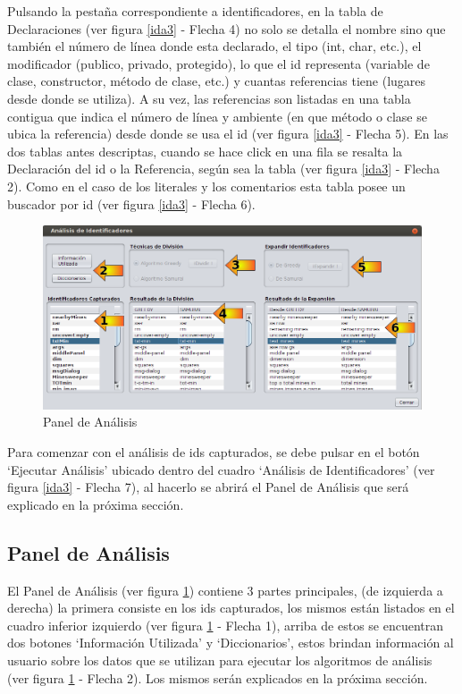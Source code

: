 \documentclass[a4paper,12pt]{report}
\begin{document}
Pulsando la pestaña correspondiente a identificadores, en la tabla de Declaraciones (ver figura \ref{ida3} - Flecha 4) no solo se detalla el nombre sino que también el número de línea donde esta declarado, el tipo (int, char, etc.), el modificador (publico, privado, protegido), lo que el id representa (variable de clase, constructor, método de clase, etc.) y cuantas referencias tiene (lugares desde donde se utiliza). A su vez, las referencias son listadas en una tabla contigua que indica el número de línea y ambiente (en que método o clase se ubica la referencia) desde donde se usa el id (ver figura \ref{ida3} - Flecha 5). En las dos tablas antes descriptas, cuando se hace click en una fila se resalta la Declaración del id o la Referencia, según sea la tabla (ver figura \ref{ida3} - Flecha 2). Como en el caso de los literales y los comentarios esta tabla posee un buscador por id (ver figura \ref{ida3} - Flecha 6). 

\begin{figure}[t] %
\centerline{%
\includegraphics[scale= 0.6]{./ida_06.png}
}
\caption{Panel de Análisis}
\label{ida6}
\end{figure}

Para comenzar con el análisis de ids capturados, se debe pulsar en el botón `Ejecutar Análisis' ubicado dentro del cuadro `Análisis de Identificadores' (ver figura \ref{ida3} - Flecha 7), al hacerlo se abrirá el Panel de Análisis que será explicado en la próxima sección.

\subsection{Panel de Análisis}

El Panel de Análisis (ver figura \ref{ida6}) contiene 3 partes principales, (de izquierda a derecha) la primera consiste en los ids capturados, los mismos están listados en el cuadro inferior izquierdo (ver figura \ref{ida6} - Flecha 1), arriba de estos se encuentran dos botones `Información Utilizada' y `Diccionarios', estos brindan información al usuario sobre los datos que se utilizan para ejecutar los algoritmos de análisis (ver figura \ref{ida6} - Flecha 2). Los mismos serán explicados en la próxima sección.
\end{document}
